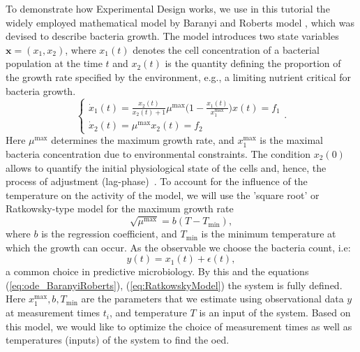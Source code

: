\documentclass[10pt,A4paper]{article}
\newcommand{\mbx}{\mathbf{x}}
\begin{document}
To demonstrate how Experimental Design works, we use in this tutorial the widely employed mathematical model by Baranyi and Roberts model \cite{baranyiDynamicApproach1994}, which was devised to describe bacteria growth.
The model introduces two state variables $\mbx = (x_1, x_2)$, where $x_1(t)$ denotes the cell concentration of a bacterial population at the time $t$ 
and $x_2(t)$ is the quantity defining the proportion of the growth rate specified by the environment, e.g., a limiting nutrient critical for bacteria growth. 
\begin{equation}
    \begin{cases}
        \dot x_1(t) = \frac{x_2(t)}{x_2(t) + 1} \mu^\text{max} \big(1 - \frac{x_1(t)}{x_1^\text{max}}\big) x(t)  = f_1 \\
        \dot x_2(t) = \mu^\text{max}  x_2(t) = f_2
    \end{cases}.
    \label{eq:ode_BaranyiRoberts}
\end{equation}
Here $\mu^\text{max}$ determines the maximum growth rate, and $x_1^\text{max}$ is the maximal bacteria concentration due to environmental constraints.
The condition $x_2(0)$ allows to quantify the initial physiological state of the cells and, hence, the process of adjustment (lag-phase)~\cite{grijspeerdt_estimating_1999}.
To account for the influence of the temperature on the activity of the model, we will use the 'square root' or Ratkowsky-type model for the maximum growth rate~\cite{ratkowsky_relationship_1982}
\begin{equation}
    \sqrt{\mu^\text{max}} = b (T - T_\text{min}),
    \label{eq:RatkowskyModel}
\end{equation} 
where $b$ is the regression coefficient, and $T_\text{min}$ is the minimum temperature at which the growth can occur.
As the observable we choose the bacteria count, i.e:
\begin{equation}
    y(t) = x_1(t)+\epsilon(t),
 \end{equation} 
a common choice in predictive microbiology.
By this and the equations (\ref{eq:ode_BaranyiRoberts}), (\ref{eq:RatkowskyModel}) the system is fully defined.
Here $x_1^\text{max}, b, T_\text{min}$ are the parameters that we estimate using observational data $y$ at measurement times $t_i$, and temperature $T$ is an input of the system.
Based on this model, we would like to optimize the choice of measurement times as well as temperatures (inputs) of the system to find the \acl{oed}.
%
\end{document}

